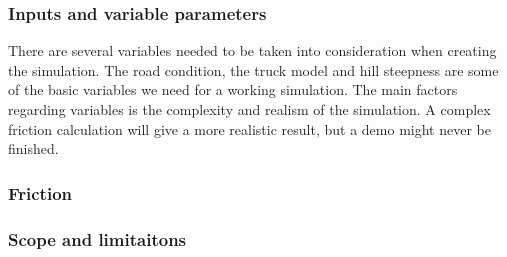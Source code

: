 \documentclass[a4,10pt]{article}
\begin{document}
\subsubsection{Inputs and variable parameters}
There are several variables needed to be taken into consideration when creating the simulation. The road condition, the truck model and hill steepness are some of the basic variables we need for a working simulation. The main factors regarding variables is the complexity and realism of the simulation. A complex friction calculation will give a more realistic result, but a demo might never be finished. 


\subsubsection{Friction}


\subsubsection{Scope and limitaitons}



\pagebreak


\end{document}
